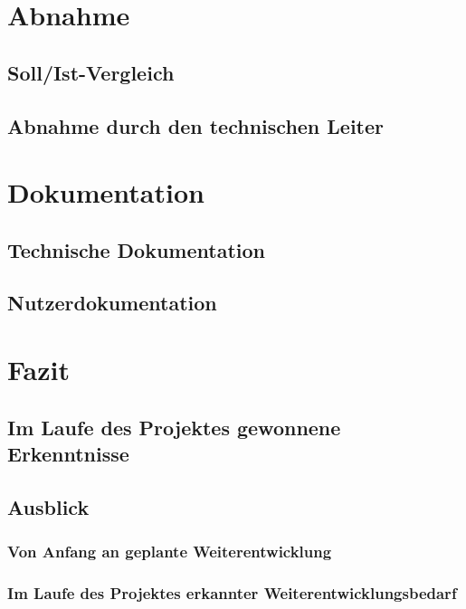 \documentclass[11pt,toc=sectionentrywithoutdots, headheight=44pt, headings=optiontoheadandtoc]{scrartcl}
\begin{document}
\section{Abnahme}
\blindtext

\subsection{Soll/Ist-Vergleich}
\blindtext

\subsection{Abnahme durch den technischen Leiter}
\blindtext

\section{Dokumentation}
\blindtext

\subsection{Technische Dokumentation}
\blindtext

\subsection{Nutzerdokumentation}
\blindtext

\section{Fazit}
\blindtext

\subsection{Im Laufe des Projektes gewonnene Erkenntnisse}
\blindtext

\subsection{Ausblick}
\blindtext

\subsubsection{Von Anfang an geplante Weiterentwicklung}
\blindtext

\subsubsection{Im Laufe des Projektes erkannter Weiterentwicklungsbedarf}
\blindtext
\end{document}

